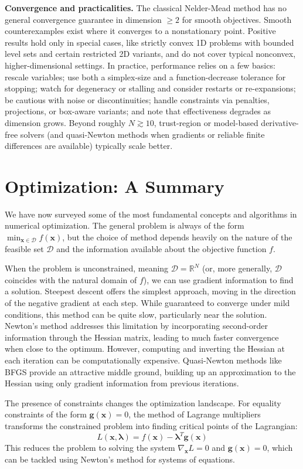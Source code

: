 \textbf{Convergence and practicalities.}\quad
The classical Nelder-Mead method has no general convergence guarantee in dimension $\ge 2$ for smooth objectives. Smooth counterexamples exist where it converges to a nonstationary point. Positive results hold only in special cases, like strictly convex 1D problems with bounded level sets and certain restricted 2D variants, and do not cover typical nonconvex, higher-dimensional settings. In practice, performance relies on a few basics: rescale variables; use both a simplex-size and a function-decrease tolerance for stopping; watch for degeneracy or stalling and consider restarts or re-expansions; be cautious with noise or discontinuities; handle constraints via penalties, projections, or box-aware variants; and note that effectiveness degrades as dimension grows. Beyond roughly $N\gtrsim 10$, trust-region or model-based derivative-free solvers (and quasi-Newton methods when gradients or reliable finite differences are available) typically scale better.

\section{Optimization: A Summary}

We have now surveyed some of the most fundamental concepts and algorithms in numerical optimization. The general problem is always of the form $\min_{\mathbf{x} \in \mathcal{D}} f(\mathbf{x})$, but the choice of method depends heavily on the nature of the feasible set $\mathcal{D}$ and the information available about the objective function $f$.

When the problem is unconstrained, meaning $\mathcal{D} = \mathbb{R}^N$ (or, more generally, $\mathcal{D}$ coincides with the natural domain of $f$), we can use gradient information to find a solution. Steepest descent offers the simplest approach, moving in the direction of the negative gradient at each step. While guaranteed to converge under mild conditions, this method can be quite slow, particularly near the solution. Newton's method addresses this limitation by incorporating second-order information through the Hessian matrix, leading to much faster convergence when close to the optimum. However, computing and inverting the Hessian at each iteration can be computationally expensive. Quasi-Newton methods like BFGS provide an attractive middle ground, building up an approximation to the Hessian using only gradient information from previous iterations.

The presence of constraints changes the optimization landscape. For equality constraints of the form $\mathbf{g}(\mathbf{x}) = 0$, the method of Lagrange multipliers transforms the constrained problem into finding critical points of the Lagrangian:
\begin{equation}
    L(\mathbf{x}, \boldsymbol{\lambda}) = f(\mathbf{x}) - \boldsymbol{\lambda}^T \mathbf{g}(\mathbf{x})
\end{equation}
This reduces the problem to solving the system $\nabla_{\mathbf{x}} L = 0$ and $\mathbf{g}(\mathbf{x}) = 0$, which can be tackled using Newton's method for systems of equations.

